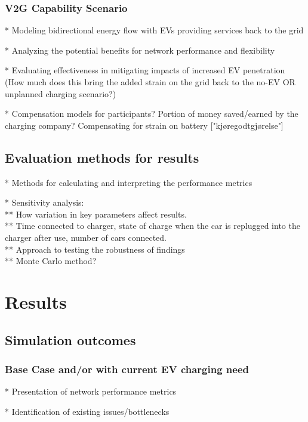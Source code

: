 \subsubsection{V2G Capability Scenario}

* Modeling bidirectional energy flow with EVs providing services back to the grid

* Analyzing the potential benefits for network performance and flexibility

* Evaluating effectiveness in mitigating impacts of increased EV penetration (How much does this bring the added strain on the grid back to the no-EV OR unplanned charging scenario?)

* Compensation models for participants? Portion of money saved/earned by the charging company? Compensating for strain on battery ["kjøregodtgjørelse"]


\subsection{Evaluation methods for results}

* Methods for calculating and interpreting the performance metrics

* Sensitivity analysis: \\
** How variation in key parameters affect results. \\ 
** Time connected to charger, state of charge when the car is replugged into the charger after use, number of cars connected. \\
** Approach to testing the robustness of findings \\
** Monte Carlo method?



\section{Results}

\subsection{Simulation outcomes}

\subsubsection{Base Case and/or with current EV charging need}

* Presentation of network performance metrics

* Identification of existing issues/bottlenecks


